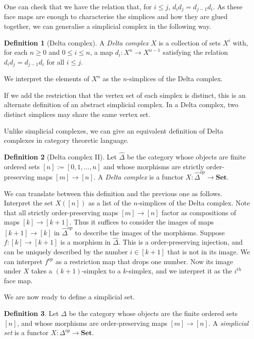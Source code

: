 \documentclass[a4paper,11pt,leqno]{article} \usepackage{amsmath}
\theoremstyle{definition}
\newtheorem{defn}{Definition}
\begin{document}
One can check that we have the relation that, for $i\leq j$, $d_id_j
= d_{j-1}d_i$.
As these face maps are enough to characterise the simplices and how they are
glued together, we can generalise a simplicial complex in the following way.

\begin{defn}[Delta complex]
  A \emph{Delta complex} $X$ is a collection of sets $X^i$ with, for each
  $n\geq 0$ and $0\leq i\leq n$, a map $d_i: X^{n}\to X^{n-1}$ satisfying the
  relation $d_id_j = d_{j-1}d_i$ for all $i\leq j$.
\end{defn}

We interpret the elements of $X^n$ as the $n$-simplices of the Delta complex.

If we add the restriction that the vertex set of each simplex is distinct, this
is an alternate definition of an abstract simplicial complex.
In a Delta complex, two distinct simplices may share the same vertex set.

Unlike simplicial complexes, we can give an equivalent definition of Delta
complexes in category theoretic language.

\begin{defn}[Delta complex II]
  Let $\hat{\Delta}$ be the category whose objects are finite ordered sets $[n]
  := [0,1,\dots,n]$ and whose morphisms are strictly order-preserving maps
  $[m]\to[n]$.
  A \emph{Delta complex} is a functor $X: \hat{\Delta}^{op}\to \textbf{Set}$.
\end{defn}

We can translate between this definition and the previous one as follows.
Interpret the set $X([n])$ as a list of the $n$-simplices of the Delta complex.
Note that all strictly order-preserving maps $[m]\to[n]$ factor as compositions
of maps $[k]\to[k+1]$.
Thus it suffices to consider the images of maps $[k+1]\to[k]$ in
$\hat{\Delta}^{op}$ to describe the images of the morphisms.
Suppose $f: [k]\to[k+1]$ is a morphism in $\hat{\Delta}$.
This is a order-preserving injection, and can be uniquely described by the
number $i\in[k+1]$ that is not in its image.
We can interpret $f^{op}$ as a restriction map that drops one number.
Now its image under $X$ takes a $(k+1)$-simplex to a $k$-simplex, and we
interpret it as the $i^{th}$ face map.

We are now ready to define a simplicial set.

\begin{defn}
  Let $\Delta$ be the category whose objects are the finite ordered sets $[n]$,
  and whose morphisms are order-preserving maps $[m]\to[n]$.
  A \emph{simplicial set} is a functor $X: \Delta^{op}\to \textbf{Set}$.
\end{defn}
\end{document}
